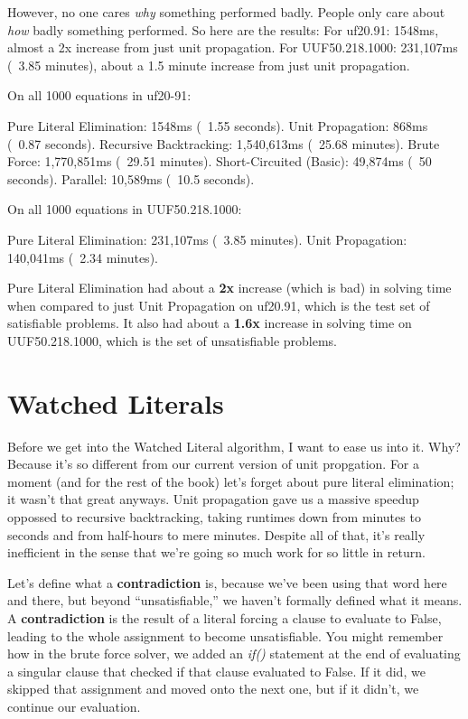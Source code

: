 \documentclass[../main.tex]{subfiles}
\begin{document}
However, no one cares \textit{why} something performed badly. People only care about 
\textit{how} badly something performed. So here are the results:
For uf20.91: 1548ms, almost a 2x increase from just unit propagation.
For UUF50.218.1000: 231,107ms (~3.85 minutes), about a 1.5 minute increase 
from just unit propagation.

\begin{FVerbatim}
On all 1000 equations in uf20-91:

Pure Literal Elimination:  1548ms (~1.55 seconds).
Unit Propagation:          868ms (~0.87 seconds).
Recursive Backtracking:    1,540,613ms (~25.68 minutes).
Brute Force:               1,770,851ms (~29.51 minutes).
Short-Circuited (Basic):   49,874ms (~50 seconds).
Parallel:                  10,589ms (~10.5 seconds).

On all 1000 equations in UUF50.218.1000:

Pure Literal Elimination: 231,107ms (~3.85 minutes).
Unit Propagation:         140,041ms (~2.34 minutes).
\end{FVerbatim}

Pure Literal Elimination had about a \textbf{2x} increase (which is bad) in solving time
when compared to just Unit Propagation on uf20.91, which is the test set of satisfiable
problems. It also had about a \textbf{1.6x} increase in solving time on UUF50.218.1000,
which is the set of unsatisfiable problems.

\section{Watched Literals}

Before we get into the Watched Literal algorithm, I want to ease us into it.
Why? Because it's so different from our current version of unit propgation. 
For a moment (and for the rest of the book) let's forget about pure literal 
elimination; it wasn't that great anyways. Unit propagation gave us a massive speedup 
oppossed to recursive backtracking, taking runtimes down from minutes to seconds and 
from half-hours to mere minutes. Despite all of that, it's really inefficient in the 
sense that we're going so much work for so little in return.

Let's define what a \textbf{contradiction} is, because we've been using that word 
here and there, but beyond ``unsatisfiable,'' we haven't formally defined what it means.
A \textbf{contradiction} is the result of a literal forcing a clause to evaluate to False,
leading to the whole assignment to become unsatisfiable. You might remember how in the 
brute force solver, we added an \textit{if()} statement at the end of evaluating a singular 
clause that checked if that clause evaluated to False. If it did, we skipped that assignment 
and moved onto the next one, but if it didn't, we continue our evaluation. 
\end{document}

